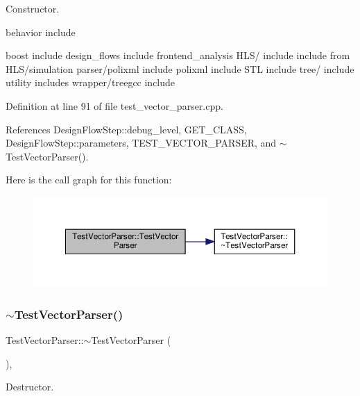Constructor. 

behavior include

boost include design\+\_\+flows include frontend\+\_\+analysis H\+L\+S/ include include from H\+L\+S/simulation parser/polixml include polixml include S\+TL include tree/ include utility includes wrapper/treegcc include 

Definition at line 91 of file test\+\_\+vector\+\_\+parser.\+cpp.



References Design\+Flow\+Step\+::debug\+\_\+level, G\+E\+T\+\_\+\+C\+L\+A\+SS, Design\+Flow\+Step\+::parameters, T\+E\+S\+T\+\_\+\+V\+E\+C\+T\+O\+R\+\_\+\+P\+A\+R\+S\+ER, and $\sim$\+Test\+Vector\+Parser().

Here is the call graph for this function\+:
\nopagebreak
\begin{figure}[H]
\begin{center}
\leavevmode
\includegraphics[width=350pt]{d8/d4e/classTestVectorParser_a9a879310446467aa26d063b61ead983e_cgraph}
\end{center}
\end{figure}
\mbox{\label{classTestVectorParser_a517254f8072a45d179287ebb6125fef7}} 
\subsubsection{\texorpdfstring{$\sim$\+Test\+Vector\+Parser()}{~TestVectorParser()}}
{\footnotesize\ttfamily Test\+Vector\+Parser\+::$\sim$\+Test\+Vector\+Parser (\begin{DoxyParamCaption}{ }\end{DoxyParamCaption})\hspace{0.3cm}{\ttfamily [override]}, {\ttfamily [default]}}



Destructor. 



